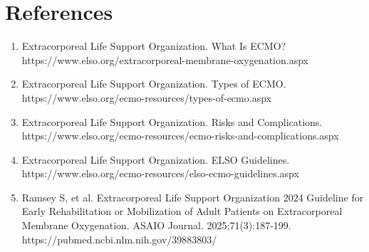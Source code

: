 \section*{References}
\begin{enumerate}
  \item Extracorporeal Life Support Organization. What Is ECMO? https://www.elso.org/extracorporeal-membrane-oxygenation.aspx
  \item Extracorporeal Life Support Organization. Types of ECMO. https://www.elso.org/ecmo-resources/types-of-ecmo.aspx
  \item Extracorporeal Life Support Organization. Risks and Complications. https://www.elso.org/ecmo-resources/ecmo-risks-and-complications.aspx
  \item Extracorporeal Life Support Organization. ELSO Guidelines. https://www.elso.org/ecmo-resources/elso-ecmo-guidelines.aspx
  \item Ramsey S, et al. Extracorporeal Life Support Organization 2024 Guideline for Early Rehabilitation or Mobilization of Adult Patients on Extracorporeal Membrane Oxygenation. ASAIO Journal. 2025;71(3):187-199. https://pubmed.ncbi.nlm.nih.gov/39883803/
\end{enumerate}

\clearpage
